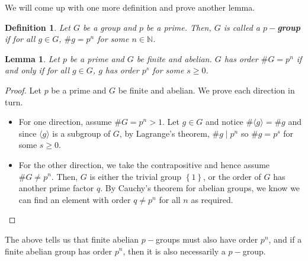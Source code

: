 \documentclass[letterpaper,12pt]{article}
\newcommand{\set}[1]{\left\{ #1 \right\}}
\newtheorem{lemma}{Lemma}[section]
\newtheorem{definition}{Definition}[section]
\begin{document}
We will come up with one more definition and prove another lemma. 
\begin{definition}
    Let $G$ be a group and $p$ be a prime. Then, $G$ is called a $p-$\textbf{group} if for all $g \in G$, $\# g = p^n$ for some $n \in \mathbb{N}$.
\end{definition}
\begin{lemma}
    Let $p$ be a prime and $G$ be finite and abelian. $G$ has order $\#G =p^n$ if and only if for all $g \in G$, $g$ has order $p^s$ for some $s \geq 0$.
\end{lemma}
\begin{proof}
     Let $p$ be a prime and $G$ be finite and abelian. We prove each direction in turn. \begin{itemize}
        \item For one direction, assume $\#G =p^n > 1$. Let $g \in G$ and notice $\# \langle g \rangle = \# g$ and since $ \langle g \rangle $ is a subgroup of $G$, by Lagrange's theorem, $\# g \mid p^n$ so $\# g = p^s$ for some $s \geq 0$.
        \item For the other direction, we take the contrapositive and hence assume $\#G \neq p^n$. Then, $G$ is either the trivial group $\set{1}$, or the order of $G$ has another prime factor $q$. By Cauchy's theorem for abelian groups, we know we can find an element with order $q\neq p^n$ for all $n$ as required.
    \end{itemize}
\end{proof}
The above tells us that finite abelian $p-$groups must also have order $p^n$, and if a finite abelian group has order $p^n$, then it is also necessarily a $p-$group. 
\end{document}
